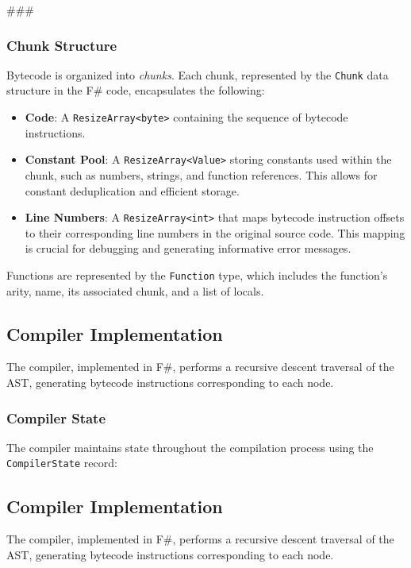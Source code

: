### \subsubsection{Chunk Structure}

Bytecode is organized into \textit{chunks}. Each chunk, represented by the \texttt{Chunk} data structure in the F\# code, encapsulates the following:

\begin{itemize}
    \item \textbf{Code}: A \texttt{ResizeArray<byte>} containing the sequence of bytecode instructions.
    \item \textbf{Constant Pool}: A \texttt{ResizeArray<Value>} storing constants used within the chunk, such as numbers, strings, and function references. This allows for constant deduplication and efficient storage.
    \item \textbf{Line Numbers}: A \texttt{ResizeArray<int>} that maps bytecode instruction offsets to their corresponding line numbers in the original source code. This mapping is crucial for debugging and generating informative error messages.
\end{itemize}

Functions are represented by the \texttt{Function} type, which includes the function's arity, name, its associated chunk, and a list of locals.

\subsection{Compiler Implementation}

The compiler, implemented in F#, performs a recursive descent traversal of the AST, generating bytecode instructions corresponding to each node.

\subsubsection{Compiler State}

The compiler maintains state throughout the compilation process using the \texttt{CompilerState} record:

\subsection{Compiler Implementation}

The compiler, implemented in F#, performs a recursive descent traversal of the AST, generating bytecode instructions corresponding to each node.

